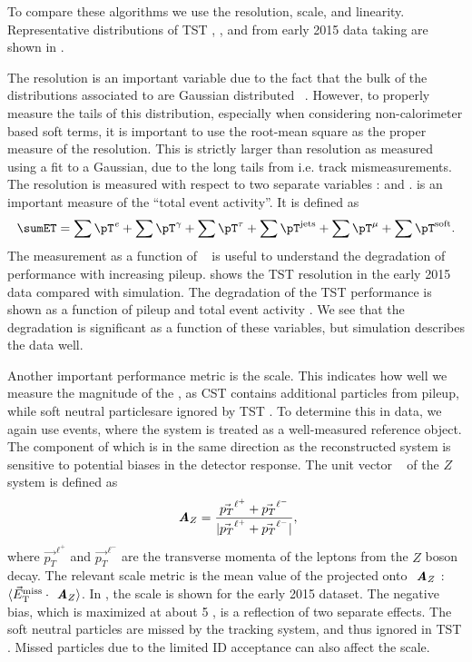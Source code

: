 To compare these algorithms we use the \met resolution, \met scale, and linearity.
Representative distributions of TST , , and  \met from early 2015 data taking are shown in .

The \met resolution is an important variable due to the fact that the bulk of the distributions associated to  are Gaussian distributed ~\cite{Aad2012}.
However, to properly measure the tails of this distribution, especially when considering non-calorimeter based soft terms, it is important to use the root-mean square as the proper measure of the resolution.
This is strictly larger than resolution as measured using a fit to a Gaussian, due to the long tails from i.e. track mismeasurements.
The resolution is measured with respect to two separate variables : \sumET and \npv.
\sumET is an important measure of the ``total event activity''.
It is defined as
\begin{equation}
  \sumET =
  \sum \pT^{\text{\textit{e}}}       +
  \sum \pT^{\mathrm{\gamma}}   +
  \sum \pT^{\mathrm{\tau}}        +
  \sum \pT^{\text{jets}}      +
  \sum \pT^{\mathrm{\mu}}     +
  \sum \pT^{\text{soft}}.
 \label{eq:sumet}
\end{equation}
The measurement as a function of \npv~ is useful to understand the degradation of \met performance with increasing pileup.
 shows the TST \met resolution in the early 2015 data compared with simulation.
The degradation of the TST \met performance is shown as a function of pileup \npv and total event activity \sumET.
We see that the degradation is significant as a function of these variables, but simulation describes the data well.

Another important performance metric is the \met scale.
This indicates how well we measure the magnitude of the \met, as CST \met contains additional particles from pileup, while soft neutral particles\footnotemark are ignored by TST \met.
To determine this in data, we again use \Zmm events, where the \Zmm system is treated as a well-measured reference object.
The component of \met which is in the same direction as the reconstructed \Zmm system is sensitive to potential biases in the detector response.
The unit vector \Az~ of the $Z$ system is defined as
\begin{equation}
\mathbf { \textbf{ \textit {A}}}_Z =\frac{\vec{p_T}^{\ell^+}+\vec{p_T}^{\ell^-}}{|\vec{p_T}^{\ell^+}+\vec{p_T}^{\ell^-}|},
\end{equation}
where $\vec{p_T}^{\ell^+}$ and $\vec{p_T}^{\ell^-}$ are the transverse momenta of the leptons from the $Z$ boson decay.
The relevant scale metric is the mean value of the \metvec projected onto $\mathbf { \textbf{ \textit {A}}}_Z$ :  $\langle\vec{E}_{\mathrm{T}}^{\mathrm{miss}}\cdot \mathbf { \textbf{ \textit {A}}}_Z \rangle$.
In , the scale is shown for the early 2015 dataset.
The negative bias, which is maximized at about 5 \GeV, is a reflection of two separate effects.
The soft neutral particles are missed by the tracking system, and thus ignored in TST \met.
Missed particles due to the limited ID acceptance can also affect the scale.

